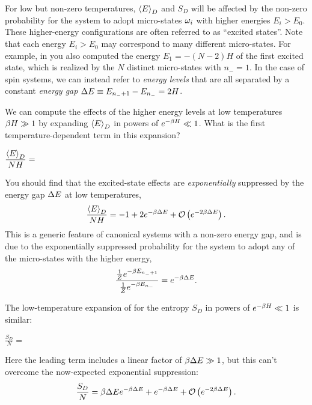 For low but non-zero temperatures, $\left\langle E \right\rangle_D$ and $S_D$ will be affected by the non-zero probability for the system to adopt micro-states $\omega_i$ with higher energies $E_i > E_0$.
These higher-energy configurations are often referred to as ``excited states''.
Note that each energy $E_i > E_0$ may correspond to many different micro-states.
For example, in  you also computed the energy $E_1 = -(N - 2)H$ of the first excited state, which is realized by the $N$ distinct micro-states with $n_- = 1$.
In the case of spin systems, we can instead refer to \textit{energy levels} that are all separated by a constant \textit{energy gap} $\Delta E \equiv E_{n_- + 1} - E_{n_-} = 2H$.

\newpage %
We can compute the effects of the higher energy levels at low temperatures $\beta H \gg 1$ by expanding $\left\langle E \right\rangle_D$ in powers of $e^{-\beta H} \ll 1$.
What is the first temperature-dependent term in this expansion?
\begin{mdframed}
  $\displaystyle \frac{\left\langle E \right\rangle_D}{NH} = $ \\[100 pt]
\end{mdframed}
You should find that the excited-state effects are \textit{exponentially} suppressed by the energy gap $\Delta E$ at low temperatures,
\begin{equation*}
  \frac{\left\langle E \right\rangle_D}{NH} = -1 + 2e^{-\beta \Delta E} + \mathcal O\left(e^{-2\beta \Delta E}\right).
\end{equation*}
This is a generic feature of canonical systems with a non-zero energy gap, and is due to the exponentially suppressed probability for the system to adopt any of the micro-states with the higher energy,
\begin{equation*}
  \frac{\frac{1}{Z} e^{-\beta E_{n_- + 1}}}{\frac{1}{Z} e^{-\beta E_{n_-}}} = e^{-\beta \Delta E}.
\end{equation*}

The low-temperature expansion of  for the entropy $S_D$ in powers of $e^{-\beta H} \ll 1$ is similar:
\begin{mdframed}
  $\displaystyle \frac{S_D}{N} = $ \\[100 pt]
\end{mdframed}
Here the leading term includes a linear factor of $\beta \Delta E \gg 1$, but this can't overcome the now-expected exponential suppression:
\begin{equation*}
  \frac{S_D}{N} = \beta \Delta E e^{-\beta \Delta E} + e^{-\beta \Delta E} + \mathcal O\left(e^{-2\beta \Delta E}\right).
\end{equation*}


